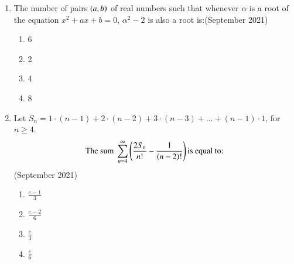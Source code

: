 \documentclass[journal,12pt,onecolumn]{IEEEtran}
\theoremstyle{remark}
\begin{document}
\begin{enumerate}
\item The number of pairs $\left(a, b\right)$ of real numbers such that whenever $\alpha$ is a root of the equation $x^2 + ax + b = 0$, $\alpha^2 - 2$ is also a root is:\hfill (September 2021)
\begin{multicols}{4}
\begin{enumerate}
    \item 6
    \item 2
    \item 4
    \item 8
\end{enumerate}
\end{multicols}

\item Let $S_n = 1 \cdot (n-1) + 2 \cdot (n-2) + 3 \cdot (n-3) + \dots + (n-1) \cdot 1$, for $n \geq 4$.
\begin{align*} \text{The sum }
\sum_{n=4}^{\infty} \left(\frac{2S_n}{n!} - \frac{1}{\left(n-2\right)!}\right) \text{is equal to:}
\end{align*}\hfill (September 2021)
\begin{multicols}{2}
\begin{enumerate}
    \item $\frac{e-1}{3}$\\
    \item $\frac{e-2}{6}$
    \item $\frac{e}{3}$\\
    \item $\frac{e}{6}$
\end{enumerate}
\end{multicols}
\end{enumerate}
\end{document}
